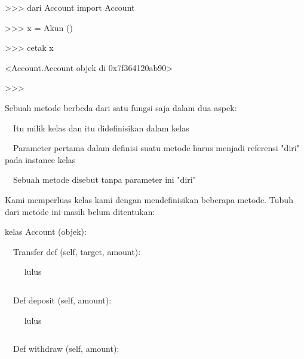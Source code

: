 \documentclass[a4paper,12pt]{report}
\begin{document}
\noindent 
\vspace{12pt}
\noindent 
\vspace{12pt}
\noindent 
\vspace{12pt}
\noindent 
>>> dari Account import Account \par
\noindent 
>>> x = Akun () \par
\noindent 
>>> cetak x \par
\noindent 
<Account.Account objek di 0x7f364120ab90> \par
\noindent 
>>> \par
\vspace{12pt}
\noindent 
Sebuah metode berbeda dari satu fungsi saja dalam dua aspek: \par
\noindent 
\vspace{12pt}
\noindent 
 $  $ $  $ $  $ $  $Itu milik kelas dan itu didefinisikan dalam kelas \par
\noindent 
 $  $ $  $ $  $ $  $Parameter pertama dalam definisi suatu metode harus menjadi referensi "diri" pada instance kelas \par
\noindent 
 $  $ $  $ $  $ $  $Sebuah metode disebut tanpa parameter ini "diri" \par
\noindent 
\vspace{12pt}
\noindent 
Kami memperluas kelas kami dengan mendefinisikan beberapa metode. Tubuh dari metode ini masih belum ditentukan: \par
\noindent 
\vspace{10pt}
\noindent 
{\fontsize{10pt}{10pt}\selectfont kelas Account (objek):} \par
\noindent 
\vspace{10pt}
\noindent 
{\fontsize{10pt}{10pt}\selectfont  $  $ $  $ $  $ $  $Transfer def (self, target, amount):} \par
\noindent 
{\fontsize{10pt}{10pt}\selectfont  $  $ $  $ $  $ $  $ $  $ $  $ $  $ $  $lulus} \par
\noindent 
{\fontsize{10pt}{10pt}\selectfont  $  $} \par
\noindent 
{\fontsize{10pt}{10pt}\selectfont  $  $ $  $ $  $ $  $Def deposit (self, amount):} \par
\noindent 
{\fontsize{10pt}{10pt}\selectfont  $  $ $  $ $  $ $  $ $  $ $  $ $  $ $  $lulus} \par
\noindent 
{\fontsize{10pt}{10pt}\selectfont  $  $} \par
\noindent 
{\fontsize{10pt}{10pt}\selectfont  $  $ $  $ $  $ $  $Def withdraw (self, amount):} \par
\end{document}
